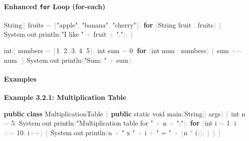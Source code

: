 \documentclass[
  justified,
  openright,
]{tufte-book}
\let\subsection\paragraph
\let\paragraph\paragraph
\newcommand{\KeywordTok}[1]{\textcolor{CodeKeyword}{\textbf{#1}}}  %
\newcommand{\StringTok}[1]{\textcolor{CodeString}{#1}}              %
\newcommand{\CodeNumTok}[1]{\textcolor{CodeNumber}{#1}}             %
\newcommand{\CodeFuncTok}[1]{\textcolor{CodeKeyword}{#1}}           %
\newcommand{\CodeTypeTok}[1]{\textcolor{CodeType}{#1}}              %
\newcommand{\OperatorTok}[1]{\textcolor{DarkGray}{#1}}              %
\newenvironment{Shaded}{%
  \begin{mdframed}[style=TufteCode]%
}{%
  \end{mdframed}%
}
\let\subsection\paragraph
\let\paragraph\paragraph
\begin{document}
\subsection{\texorpdfstring{Enhanced \texttt{for} Loop
(for-each)}{Enhanced for Loop (for-each)}}\label{enhanced-for-loop-for-each}

\begin{Shaded}
\begin{Highlighting}[]
String\OperatorTok{[]} fruits \OperatorTok{=} \OperatorTok{\{}\StringTok{"apple"}\OperatorTok{,} \StringTok{"banana"}\OperatorTok{,} \StringTok{"cherry"}\OperatorTok{\};}
\KeywordTok{for} \OperatorTok{(}String fruit \OperatorTok{:} fruits\OperatorTok{)} \OperatorTok{\{}
    System\OperatorTok{.}\CodeFuncTok{out}\OperatorTok{.}\CodeFuncTok{println}\OperatorTok{(}\StringTok{"I like "} \OperatorTok{+} fruit \OperatorTok{+} \StringTok{"."}\OperatorTok{);}
\OperatorTok{\}}
 
\CodeTypeTok{int}\OperatorTok{[]} numbers \OperatorTok{=} \OperatorTok{\{}\CodeNumTok{1}\OperatorTok{,} \CodeNumTok{2}\OperatorTok{,} \CodeNumTok{3}\OperatorTok{,} \CodeNumTok{4}\OperatorTok{,} \CodeNumTok{5}\OperatorTok{\};}
\CodeTypeTok{int} sum \OperatorTok{=} \CodeNumTok{0}\OperatorTok{;}
\KeywordTok{for} \OperatorTok{(}\CodeTypeTok{int} num \OperatorTok{:} numbers\OperatorTok{)} \OperatorTok{\{}
    sum \OperatorTok{+=} num\OperatorTok{;}
\OperatorTok{\}}
System\OperatorTok{.}\CodeFuncTok{out}\OperatorTok{.}\CodeFuncTok{println}\OperatorTok{(}\StringTok{"Sum: "} \OperatorTok{+} sum\OperatorTok{);}
\end{Highlighting}
\end{Shaded}

\subsection{Examples}\label{examples-24}

\textbf{Example 3.2.1: Multiplication Table}

\begin{Shaded}
\begin{Highlighting}[]
\KeywordTok{public} \KeywordTok{class} MultiplicationTable \OperatorTok{\{}
    \KeywordTok{public} \CodeTypeTok{static} \CodeTypeTok{void} \CodeFuncTok{main}\OperatorTok{(}String\OperatorTok{[]} args\OperatorTok{)} \OperatorTok{\{}
        \CodeTypeTok{int} n \OperatorTok{=} \CodeNumTok{5}\OperatorTok{;}
        System\OperatorTok{.}\CodeFuncTok{out}\OperatorTok{.}\CodeFuncTok{println}\OperatorTok{(}\StringTok{"Multiplication table for "} \OperatorTok{+} n \OperatorTok{+} \StringTok{":"}\OperatorTok{);}
        \KeywordTok{for} \OperatorTok{(}\CodeTypeTok{int} i \OperatorTok{=} \CodeNumTok{1}\OperatorTok{;} i \OperatorTok{\textless{}=} \CodeNumTok{10}\OperatorTok{;} i\OperatorTok{++)} \OperatorTok{\{}
            System\OperatorTok{.}\CodeFuncTok{out}\OperatorTok{.}\CodeFuncTok{println}\OperatorTok{(}n \OperatorTok{+} \StringTok{" x "} \OperatorTok{+} i \OperatorTok{+} \StringTok{" = "} \OperatorTok{+} \OperatorTok{(}n \OperatorTok{*} i\OperatorTok{));}
        \OperatorTok{\}}
    \OperatorTok{\}}
\OperatorTok{\}}
\end{Highlighting}
\end{Shaded}
\end{document}
